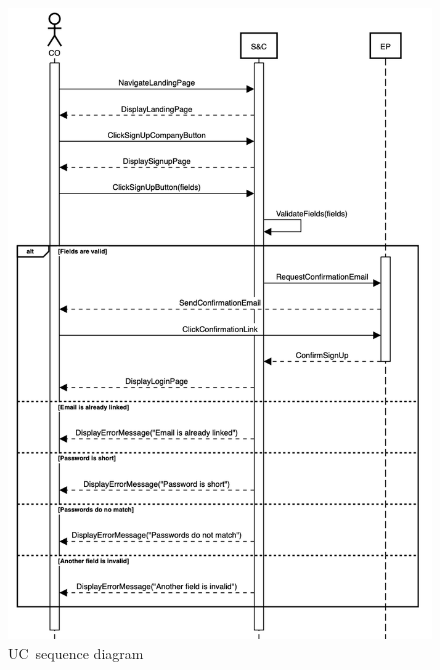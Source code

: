 \begin{figure}
    \centering
    \includegraphics[width=13cm]{images/sequence-diagrams/company-signs-up.png}
    \caption{UC\theuc\ sequence diagram}
\end{figure}


